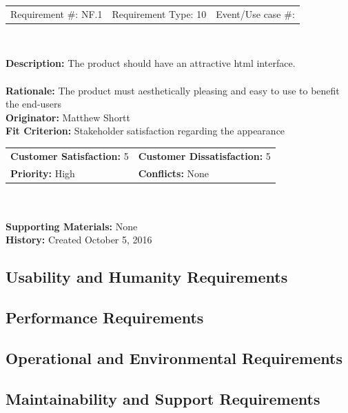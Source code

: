 \documentclass[12pt, titlepage]{article}
\begin{document}
\begin{framed}

	\begin{center}
		
		\begin{tabular}{ l c r }
			Requirement \#: NF.1 & Requirement Type: 10 & Event/Use case \#: \\
		\end{tabular} \\
	\end{center}
	\textbf{Description:} The product should have an attractive html interface. \\
	\\
	\textbf{Rationale:} The product must aesthetically pleasing and easy to use
	to benefit the end-users \\
	\textbf{Originator:} Matthew Shortt \\
	\textbf{Fit Criterion:} Stakeholder satisfaction regarding the appearance  \\

	\begin{tabular}{ll}
		\textbf{Customer Satisfaction:} 5 & \textbf{Customer Dissatisfaction:} 5 \\
		\textbf{Priority:} High & \textbf{Conflicts:} None\\
	\end{tabular} \\
	\\
	\textbf{Supporting Materials:} None \\
	\textbf{History:} Created October 5, 2016

\end{framed}





\subsection{Usability and Humanity Requirements}

\subsection{Performance Requirements}

\subsection{Operational and Environmental Requirements}

\subsection{Maintainability and Support Requirements}
\end{document}
